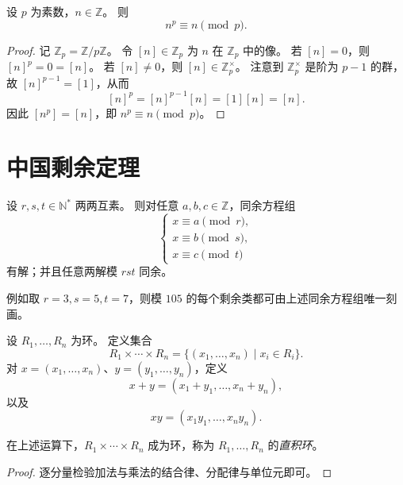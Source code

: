 \documentclass[lang=cn,a4paper,newtx]{elegantbook}
\begin{document}
\begin{theorem}[费马小定理]
  设 $p$ 为素数，$n\in\mathbb{Z}$。
  则
  \[
    n^p\equiv n\pmod p.
  \]
\end{theorem}

\begin{proof}
  记 $\mathbb{Z}_p=\mathbb{Z}/p\mathbb{Z}$。
  令 $[n]\in\mathbb{Z}_p$ 为 $n$ 在 $\mathbb{Z}_p$ 中的像。
  若 $[n]=0$，则 $[n]^p=0=[n]$。
  若 $[n]\ne 0$，则 $[n]\in\mathbb{Z}_p^{\times}$。
  注意到 $\mathbb{Z}_p^{\times}$ 是阶为 $p-1$ 的群，故 $[n]^{p-1}=[1]$，从而
  \[
    [n]^p=[n]^{p-1}[n]=[1][n]=[n].
  \]
  因此 $[n^p]=[n]$，即 $n^p\equiv n\pmod p$。
\end{proof}

\section{中国剩余定理}

\begin{theorem}
  设 $r,s,t\in\mathbb{N}^{*}$ 两两互素。
  则对任意 $a,b,c\in\mathbb{Z}$，同余方程组
  \[
    \begin{cases}
      x\equiv a\pmod r,\\
      x\equiv b\pmod s,\\
      x\equiv c\pmod t
    \end{cases}
  \]
  有解；并且任意两解模 $rst$ 同余。
\end{theorem}

\begin{remark}
  例如取 $r=3,s=5,t=7$，则模 $105$ 的每个剩余类都可由上述同余方程组唯一刻画。
\end{remark}

\begin{definition}[有限直积环]
  设 $R_1,\dots,R_n$ 为环。
  定义集合
  \[
    R_1\times\cdots\times R_n=\{(x_1,\dots,x_n)\mid x_i\in R_i\}.
  \]
  对 $x=(x_1,\dots,x_n)$、$y=(y_1,\dots,y_n)$，定义
  \[
    x+y=(x_1+y_1,\dots,x_n+y_n),
  \]
  以及
  \[
    xy=(x_1y_1,\dots,x_ny_n).
  \]
\end{definition}

\begin{proposition}
  在上述运算下，$R_1\times\cdots\times R_n$ 成为环，称为 $R_1,\dots,R_n$ 的\emph{直积环}。
\end{proposition}

\begin{proof}
  逐分量检验加法与乘法的结合律、分配律与单位元即可。
\end{proof}
\end{document}
